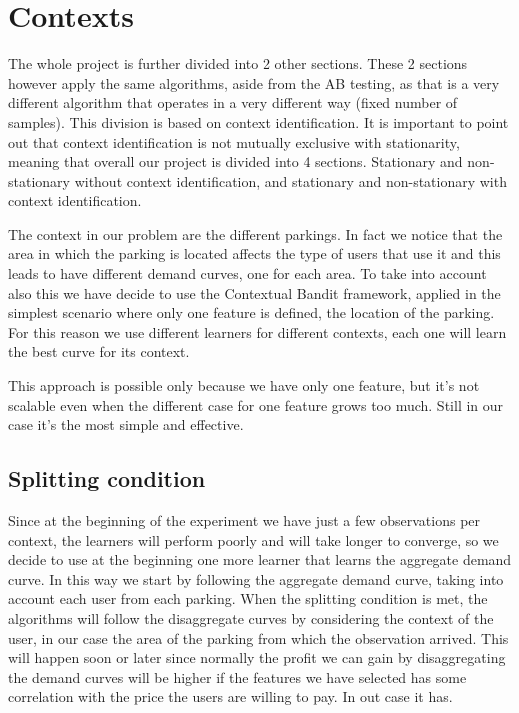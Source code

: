 \newpage
\section{Contexts}\label{sec:contexts}

The whole project is further divided into 2 other sections. These 2 sections however apply the same algorithms, aside from the AB testing, as that is a very different algorithm that operates in a very different way (fixed number of samples).
This division is based on context identification.
It is important to point out that context identification is not mutually exclusive with stationarity, meaning that overall our project is divided into 4 sections. Stationary and non-stationary without context identification, and stationary and non-stationary with context identification. 

The context in our problem are the different parkings. In fact we notice that the area in which the parking is located affects the type of users that use it and this leads to have different demand curves, one for each area. To take into account also this we have decide to use the Contextual Bandit framework, applied in the simplest scenario where only one feature is defined, the location of the parking. For this reason we use different learners for different contexts, each one will learn the best curve for its context.

This approach is possible only because we have only one feature, but it's not scalable even when the different case for one feature grows too much. Still in our case it's the most simple and effective.

\subsection{Splitting condition}\label{subsec:splitting-condition}
Since at the beginning of the experiment we have just a few observations per context, the learners will perform poorly and will take longer to converge, so we decide to use at the beginning one more learner that learns the aggregate demand curve. In this way we start by following the aggregate demand curve, taking into account each user from each parking. When the splitting condition is met, the algorithms will follow the disaggregate curves by considering the context of the user, in our case the area of the parking from which the observation arrived. This will happen soon or later since normally the profit we can gain by disaggregating the demand curves will be higher if the features we have selected has some correlation with the price the users are willing to pay. In out case it has.

